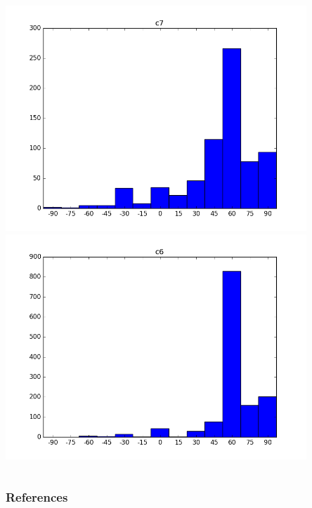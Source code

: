 \documentclass{beamer}
\begin{document}
\begin{frame}
\begin{columns}
\begin{column}{0.5\textwidth}
\begin{center}
		 			\includegraphics[width=0.85\textwidth]{headpose_evaluation_c7}\\
		 			\includegraphics[width=0.85\textwidth]{headpose_evaluation_c6}
		 		\end{center}
		 	\end{column}
		 \end{columns}
		
	\end{frame}
	


    
	\begin{frame}[allowframebreaks]
		\frametitle{References} 
		\nocite{*} 
		 
		 
	\end{frame}

	\medskip
\end{document}
